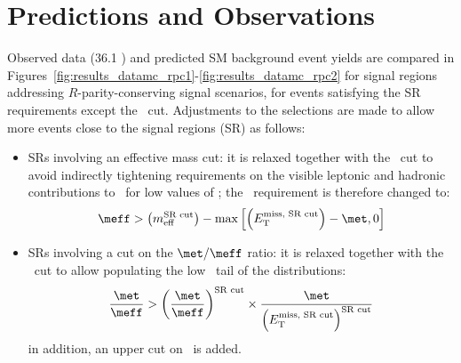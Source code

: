 \section{Predictions and Observations}

Observed data (36.1 \ifb) and predicted SM background event yields 
are compared in Figures~\ref{fig:results_datamc_rpc1}-\ref{fig:results_datamc_rpc2} for signal regions addressing $R$-parity-conserving signal scenarios, 
for events satisfying the SR requirements except the \met\ cut. Adjustments to the selections are made to allow more events close to the signal regions (SR) as follows: 
\begin{itemize}
\item SRs involving an effective mass cut: it is relaxed 
together with the \met\ cut to avoid indirectly tightening requirements 
on the visible leptonic and hadronic contributions to \meff\ for low values of \met; 
the \meff\ requirement is therefore changed to:
$$
\meff > \left(m_\mathrm{eff}^\text{SR cut}\right) - \operatorname{max}\left[\left(E_\mathrm{T}^\text{miss, SR cut}\right)-\met,0\right]
$$
\item SRs involving a cut on the $\met/\meff$ ratio: it is relaxed together with the \met\ cut 
to allow populating the low \met\ tail of the distributions: 
$$
\frac{\met}{\meff} > \left(\frac{\met}{\meff}\right)^\text{SR cut}\times \frac{\met}{\left(E_\mathrm{T}^\text{miss, SR cut}\right)^\text{SR cut}}
$$
in addition, an upper cut on \meff\ is added. 
\end{itemize}

